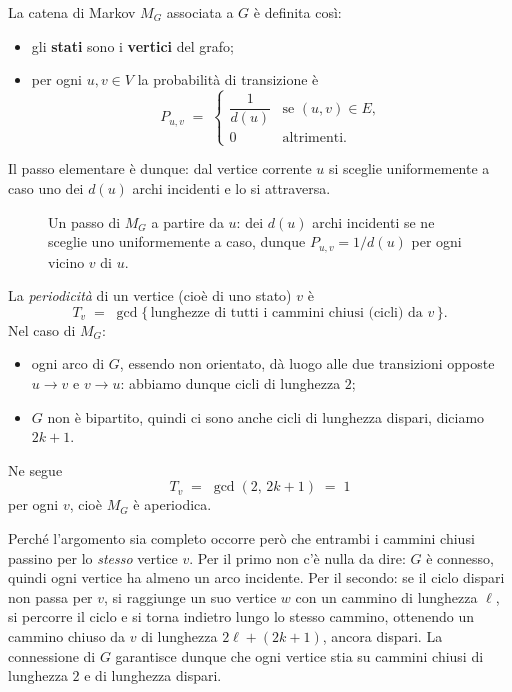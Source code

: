 \begin{definizione}\label{def:random-walk-grafo}
  La catena di Markov $M_G$ associata a $G$ è definita così:
  \begin{itemize}
    \item gli \textbf{stati} sono i \textbf{vertici} del grafo;
    \item per ogni $u, v \in V$ la probabilità di transizione è
      \[
        P_{u,v} \;=\;
        \begin{cases}
          \dfrac{1}{d(u)} & \text{se } (u,v) \in E,\\[8pt]
          0 & \text{altrimenti.}
        \end{cases}
      \]
  \end{itemize}
  Il passo elementare è dunque: dal vertice corrente $u$ si sceglie uniformemente a caso
  uno dei $d(u)$ archi incidenti e lo si attraversa.
\end{definizione}

\begin{figure}[H]
  \centering
  
  \caption{Un passo di $M_G$ a partire da $u$: dei $d(u)$ archi incidenti se ne sceglie
  uno uniformemente a caso, dunque $P_{u,v} = 1/d(u)$ per ogni vicino $v$ di $u$.}
  \label{fig:transizioni-mg}
\end{figure}

\begin{osservazione}[$M_G$ è aperiodica]
  La \emph{periodicità} di un vertice (cioè di uno stato) $v$ è
  \[
    T_v \;=\; \gcd\bigl\{\, \text{lunghezze di tutti i cammini chiusi (cicli) da } v \,\bigr\}.
  \]
  Nel caso di $M_G$:
  \begin{itemize}
    \item ogni arco di $G$, essendo non orientato, dà luogo alle due transizioni opposte
      $u \to v$ e $v \to u$: abbiamo dunque cicli di lunghezza $2$;
    \item $G$ non è bipartito, quindi ci sono anche cicli di lunghezza dispari, diciamo
      $2k+1$.
  \end{itemize}
  Ne segue
  \[
    T_v \;=\; \gcd(2,\, 2k+1) \;=\; 1
  \]
  per ogni $v$, cioè $M_G$ è aperiodica.

  Perché l'argomento sia completo occorre però che entrambi i cammini chiusi passino per lo
  \emph{stesso} vertice $v$. Per il primo non c'è nulla da dire: $G$ è connesso, quindi ogni
  vertice ha almeno un arco incidente. Per il secondo: se il ciclo dispari non passa per
  $v$, si raggiunge un suo vertice $w$ con un cammino di lunghezza $\ell$, si percorre il
  ciclo e si torna indietro lungo lo stesso cammino, ottenendo un cammino chiuso da $v$ di
  lunghezza $2\ell + (2k+1)$, ancora dispari. La connessione di $G$ garantisce dunque che
  ogni vertice stia su cammini chiusi di lunghezza $2$ e di lunghezza dispari.
\end{osservazione}

